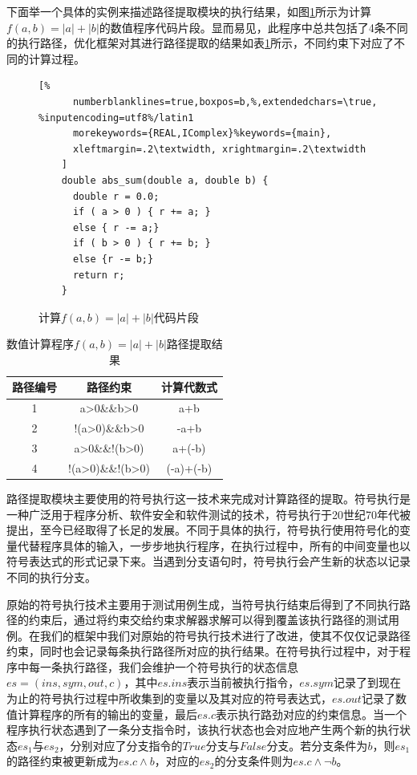 下面举一个具体的实例来描述路径提取模块的执行结果，如图\ref{lst:symextexam}所示为计算$f(a,b)=|a|+|b|$的数值程序代码片段。显而易见，此程序中总共包括了4条不同的执行路径，优化框架对其进行路径提取的结果如表\ref{tbl:abssumres}所示，不同约束下对应了不同的计算过程。

\begin{figure}[thbp]
    \begin{lstlisting}[%
      numberblanklines=true,boxpos=b,%,extendedchars=\true, %inputencoding=utf8%/latin1
      morekeywords={REAL,IComplex}%keywords={main},
      xleftmargin=.2\textwidth, xrightmargin=.2\textwidth
    ]
    double abs_sum(double a, double b) {
      double r = 0.0;
      if ( a > 0 ) { r += a; } 
      else { r -= a;}
      if ( b > 0 ) { r += b; }
      else {r -= b;}
      return r;
    }
    \end{lstlisting}
    \caption{计算$f(a,b)=|a|+|b|$代码片段}
    \label{lst:symextexam}
\end{figure}

\begin{table}
  \centering
  \begin{tabular}{ccc}
    \toprule
    \textbf{路径编号} & \textbf{路径约束} & \textbf{计算代数式} \\
    \midrule
    1 & a>0\&\&b>0 & a+b \\
    2 & !(a>0)\&\&b>0 & -a+b \\
    3 & a>0\&\&!(b>0) & a+(-b) \\
    4 & !(a>0)\&\&!(b>0) & (-a)+(-b) \\
    \bottomrule
  \end{tabular}
  \caption{数值计算程序$f(a,b)=|a|+|b|$路径提取结果}\label{tbl:abssumres}
\end{table}

路径提取模块主要使用的符号执行这一技术来完成对计算路径的提取。符号执行是一种广泛用于程序分析、软件安全和软件测试的技术，符号执行于20世纪70年代被提出，至今已经取得了长足的发展。不同于具体的执行，符号执行使用符号化的变量代替程序具体的输入，一步步地执行程序，在执行过程中，所有的中间变量也以符号表达式的形式记录下来。当遇到分支语句时，符号执行会产生新的状态以记录不同的执行分支。

原始的符号执行技术主要用于测试用例生成，当符号执行结束后得到了不同执行路径的约束后，通过将约束交给约束求解器求解可以得到覆盖该执行路径的测试用例。在我们的框架中我们对原始的符号执行技术进行了改进，使其不仅仅记录路径约束，同时也会记录每条执行路径所对应的执行结果。在符号执行过程中，对于程序中每一条执行路径，我们会维护一个符号执行的状态信息$es=(ins, sym, out, c)$，其中$es.ins$表示当前被执行指令，$es.sym$记录了到现在为止的符号执行过程中所收集到的变量以及其对应的符号表达式，$es.out$记录了数值计算程序的所有的输出的变量，最后$es.c$表示执行路劲对应的约束信息。当一个程序执行状态遇到了一条分支指令时，该执行状态也会对应地产生两个新的执行状态$es_1$与$es_2$，分别对应了分支指令的$True$分支与$False$分支。若分支条件为$b$，则$es_1$的路径约束被更新成为$es.c \wedge b$，对应的$es_2$的分支条件则为$es.c \wedge \neg b$。

